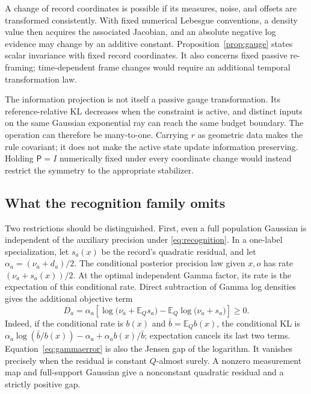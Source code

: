 \documentclass[11pt]{article}
\newcommand{\E}{\mathbb E}
\begin{document}
A change of record coordinates is possible if its measures, noise, and offsets are transformed consistently. With fixed numerical Lebesgue conventions, a density value then acquires the associated Jacobian, and an absolute negative log evidence may change by an additive constant. Proposition~\ref{prop:gauge} states scalar invariance with fixed record coordinates. It also concerns fixed passive re-framing; time-dependent frame changes would require an additional temporal transformation law.

The information projection is not itself a passive gauge transformation. Its reference-relative KL decreases when the constraint is active, and distinct inputs on the same Gaussian exponential ray can reach the same budget boundary. The operation can therefore be many-to-one. Carrying $r$ as geometric data makes the rule covariant; it does not make the active state update information preserving. Holding $\mathsf P=I$ numerically fixed under every coordinate change would instead restrict the symmetry to the appropriate stabilizer.

\subsection{What the recognition family omits}
\label{sec:projectionerrors}

Two restrictions should be distinguished. First, even a full population Gaussian is independent of the auxiliary precision under \eqref{eq:recognition}. In a one-label specialization, let $s_a(x)$ be the record's quadratic residual, and let $\alpha_a=(\nu_a+d_a)/2$. The conditional posterior precision law given $x,o$ has rate $(\nu_a+s_a(x))/2$. At the optimal independent Gamma factor, its rate is the expectation of this conditional rate. Direct subtraction of Gamma log densities gives the additional objective term
\begin{equation}
D_a=\alpha_a\left[\log\bigl(\nu_a+\E_Q s_a\bigr)
-\E_Q\log\bigl(\nu_a+s_a\bigr)\right]\ge0.
\label{eq:gammaerror}
\end{equation}
Indeed, if the conditional rate is $b(x)$ and $\bar b=\E_Q b(x)$, the conditional KL is $\alpha_a\log(\bar b/b(x))-\alpha_a+\alpha_a b(x)/\bar b$; expectation cancels its last two terms. Equation~\eqref{eq:gammaerror} is also the Jensen gap of the logarithm. It vanishes precisely when the residual is constant $Q$-almost surely. A nonzero measurement map and full-support Gaussian give a nonconstant quadratic residual and a strictly positive gap.
\end{document}
